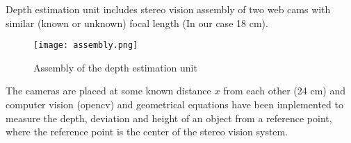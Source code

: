 \documentclass[../block_diagram_intro/block_diagram_intro.tex]{subfiles}
\begin{document}
    
Depth estimation unit includes stereo vision assembly of two web cams with similar 
(known or unknown) focal length (In our case 18 cm).

\begin{figure}[h]
    \texttt{[image: assembly.png]}
    \caption{Assembly of the depth estimation unit}
\end{figure}

The cameras are placed at some known distance \(x \) from each other (24 cm) and 
computer vision (opencv) and geometrical equations have been implemented to measure the 
depth, deviation and height of an object from a reference point, where the reference point 
is the center of the stereo vision system. 
\end{document}

